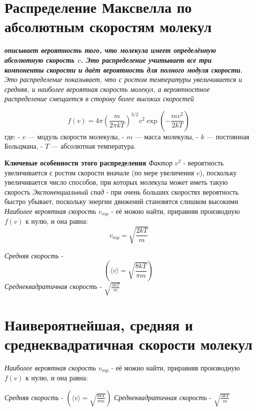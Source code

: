 \documentclass[14pt]{article}
\begin{document}
\section{Распределение Максвелла по абсолютным скоростям молекул}
\textbf{\textit{описывает вероятность того, что молекула имеет определённую абсолютную скорость \(v\). Это распределение учитывает все три компоненты скорости и даёт вероятность для полного модуля скорости.}}
\textit{Это распределение показывает, что с ростом температуры увеличивается и средняя, и наиболее вероятная скорость молекул, а вероятностное распределение смещается в сторону более высоких скоростей}
\begin{center}
    \[ f(v) = 4\pi \left(\frac{m}{2\pi k T}\right)^{3/2} v^2 \exp\left(-\frac{m v^2}{2k T}\right) \]
    \newline где: - \(v\) — модуль скорости молекулы, - \(m\) — масса молекулы, - \(k\) — постоянная Больцмана, - \(T\) — абсолютная температура.
\end{center}

\textbf{Ключевые особенности этого распределения}
\newline \textit{Фактор} \(v^2\) - вероятность увеличивается с ростом скорости вначале (по мере увеличения \(v\)), поскольку увеличивается число способов, при которых молекула может иметь такую скорость
\newline \textit{Экспоненциальный спад} -  при очень больших скоростях вероятность быстро убывает, поскольку энергии движений становятся слишком высокими
\newline \textit{Наиболее вероятная скорость \(v_{mp}\)} - её можно найти, приравняв производную \(f(v)\) к нулю, и она равна: \[ v_{mp} = \sqrt{\frac{2kT}{m}} \] 

\textit{Средняя скорость} - \[ (\langle v \rangle = \sqrt{ \frac{ 8kT }{ \pi m} }) \]
\textit{Среднеквадратичная скорость} - $\sqrt{ \frac{3kT}{m} }$

\section{Наивероятнейшая, средняя и среднеквадратичная скорости молекул}
\textit{Наиболее вероятная скорость \(v_{mp}\)} - её можно найти, приравняв производную \(f(v)\) к нулю, и она равна: 
\begin{center}
    \big[\[ v_{mp} = \sqrt{\frac{2kT}{m}} \]\big]
\end{center} 
\textit{Средняя скорость} - $(\langle v \rangle = \sqrt{\frac{8kT}{\pi m}})$
\textit{Среднеквадратичная скорость} - $\sqrt{\frac{3kT}{m}}$
\end{document}
